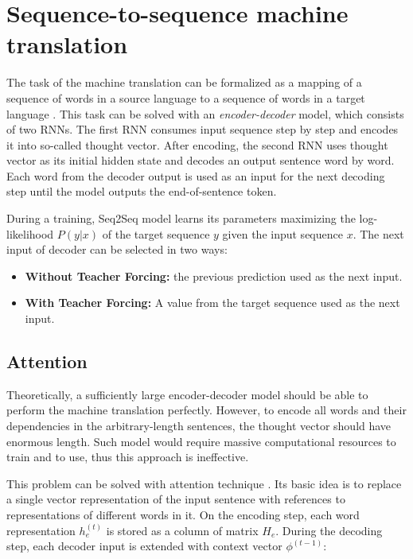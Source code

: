\section{Sequence-to-sequence machine translation} \label{seq2seq}
The task of the machine translation can be formalized as a mapping of a sequence of words in a source language to a sequence of words in a target language \parencite{Neubig2017}. This task can be solved with an \emph{encoder-decoder} model, which consists of two RNNs. The first RNN consumes input sequence step by step and encodes it into so-called thought vector. After encoding, the second RNN uses thought vector as its initial hidden state and decodes an output sentence word by word.  Each word from the decoder output is used as an input for the next decoding step until the model outputs the end-of-sentence token. 

During a training, Seq2Seq model learns its parameters maximizing the log-likelihood $P(y|x)$ of the target sequence $y$ given the input sequence $x$. The next input of decoder can be selected in two ways:
    \begin{itemize}
    	\item \textbf{Without Teacher Forcing:} the previous prediction used as the next input.
    	\item \textbf{With Teacher Forcing:} A value from the target sequence used as the next input.
    \end{itemize}


\subsection{Attention} \label{attention}
Theoretically, a sufficiently large encoder-decoder model should be able to perform the machine translation perfectly. However, to encode all words and  their dependencies in the arbitrary-length sentences, the thought vector should have enormous length. Such model would require massive computational resources to train and to use,  thus this approach is ineffective.

This problem can be solved with attention technique \parencite{Bahdanau2014}. Its basic idea is to replace a single vector representation of the  input sentence with references to representations of different words in it. On the encoding step, each word representation $h_e^{(t)}$ is stored as a column of matrix $H_e$. During the decoding step, each decoder input is extended with context vector $\phi^{(t-1)}$:

